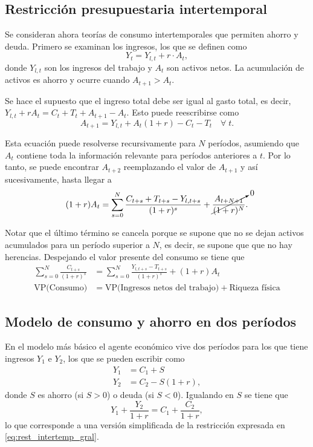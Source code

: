 \documentclass[DeGregorioResumen]{subfiles}
\begin{document}
\subsection{Restricción presupuestaria intertemporal}

Se consideran ahora teorías de consumo intertemporales que permiten ahorro y deuda. Primero se examinan los ingresos, los que se definen como
\begin{equation}
Y_t=Y_{l,t}+r\cdot A_t,
\end{equation}
donde $Y_{l,t}$ son los ingresos del trabajo y $A_t$ son activos netos. La acumulación de activos es ahorro y ocurre cuando $A_{t+1}>A_t$.

Se hace el supuesto que el ingreso total debe ser igual al gasto total, es decir, $Y_{l,t}+rA_t=C_t+T_t+A_{t+1}-A_t$. Esto puede reescribirse como
\begin{equation*}
A_{t+1}=Y_{l,t}+A_t(1+r)-C_t-T_t \quad \forall \; t.
\end{equation*}

Esta ecuación puede resolverse recursivamente para $N$ períodos, asumiendo que $A_t$ contiene toda la información relevante para períodos anteriores a $t$. Por lo tanto, se puede encontrar $A_{t+2}$ reemplazando el valor de $A_{t+1}$ y así sucesivamente, hasta llegar a
\begin{equation*}
(1+r)A_t=\sum_{s=0}^N\frac{C_{t+s}+T_{t+s}-Y_{l,t+s}}{(1+r)^s}+\cancelto{0}{\frac{A_{t+N+1}}{(1+r)^N}}.
\end{equation*}

Notar que el último término se cancela porque se supone que no se dejan activos acumulados para un período superior a $N$, es decir, se supone que que no hay herencias. Despejando el valor presente del consumo se tiene que
\begin{align}
\sum_{s=0}^N\frac{C_{t+s}}{(1+r)^s}&=\sum_{s=0}^N\frac{Y_{l,t+s}-T_{t+s}}{(1+r)^s}+(1+r)A_t \label{eq:rest_intertemp_gral} \\
\text{VP(Consumo)}&=\text{VP(Ingresos netos del trabajo)}+\text{Riqueza física} \nonumber
\end{align}

\subsection{Modelo de consumo y ahorro en dos períodos}

En el modelo más básico el agente económico vive dos períodos para los que tiene ingresos $Y_1$ e $Y_2$, los que se pueden escribir como
\begin{align*}
Y_1 &= C_1+S \\
Y_2 &= C_2-S(1+r),
\end{align*}
donde $S$ es ahorro (si $S>0$) o deuda (si $S<0$). Igualando en $S$ se tiene que
\begin{equation}
Y_1+\frac{Y_2}{1+r}=C_1+\frac{C_2}{1+r},
\end{equation}
lo que corresponde a una versión simplificada de la restricción expresada en \eqref{eq:rest_intertemp_gral}.
\end{document}
